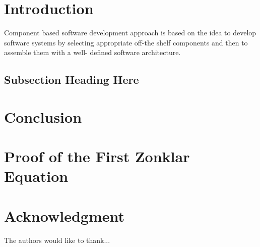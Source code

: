 \documentclass[conference]{IEEEtran}
\begin{document}
\section{Introduction}
Component based software development approach is based on
the idea to develop software systems by selecting appropriate
off-the shelf components and then to assemble them with a well-
defined software architecture. \cite{kaur2010component}


\subsection{Subsection Heading Here}
\blindtext


\section{Conclusion}
\blindtext


\appendices
\section{Proof of the First Zonklar Equation}
\blindtext

\section*{Acknowledgment}
The authors would like to thank...

\ifCLASSOPTIONcaptionsoff
  \newpage
\fi




\end{document}
